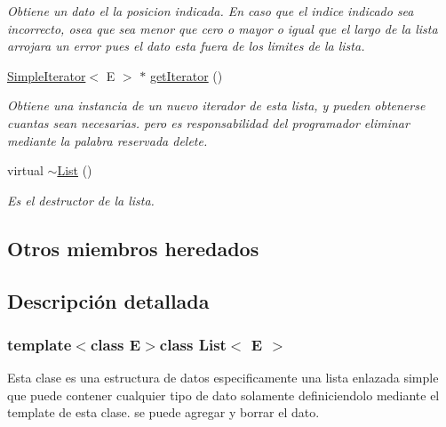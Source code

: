 \begin{DoxyCompactItemize}
\begin{DoxyCompactList}\small\item\em Obtiene un dato el la posicion indicada. En caso que el indice indicado sea incorrecto, osea que sea menor que cero o mayor o igual que el largo de la lista arrojara un error pues el dato esta fuera de los limites de la lista. \end{DoxyCompactList}\item 
\hyperlink{classSimpleIterator}{Simple\-Iterator}$<$ E $>$ $\ast$ \hyperlink{classList_accb5fe71cb60ba7bf0ccab362b1f87cb}{get\-Iterator} ()
\begin{DoxyCompactList}\small\item\em Obtiene una instancia de un nuevo iterador de esta lista, y pueden obtenerse cuantas sean necesarias. pero es responsabilidad del programador eliminar mediante la palabra reservada delete. \end{DoxyCompactList}\item 
\hypertarget{classList_a0af4c4d8a3d0710e58b12db35f9b0a3d}{virtual \hyperlink{classList_a0af4c4d8a3d0710e58b12db35f9b0a3d}{$\sim$\-List} ()}\label{classList_a0af4c4d8a3d0710e58b12db35f9b0a3d}

\begin{DoxyCompactList}\small\item\em Es el destructor de la lista. \end{DoxyCompactList}\end{DoxyCompactItemize}
\subsection*{Otros miembros heredados}


\subsection{Descripción detallada}
\subsubsection*{template$<$class E$>$class List$<$ E $>$}

Esta clase es una estructura de datos especificamente una lista enlazada simple que puede contener cualquier tipo de dato solamente definiciendolo mediante el template de esta clase. se puede agregar y borrar el dato. 

